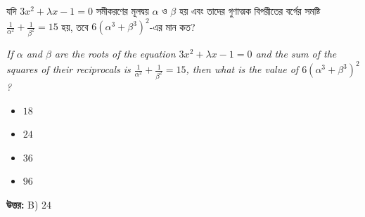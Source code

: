 \documentclass[12pt, a4paper]{article}
\begin{document}
\vspace{1.5em}

\begin{tcolorbox}[questionbox={প্রশ্ন (Question) 39}]
    \noindent
    যদি $3x^2 + \lambda x - 1 = 0$ সমীকরণের মূলদ্বয় $\alpha$ ও $\beta$ হয় এবং তাদের গুণাত্মক বিপরীতের বর্গের সমষ্টি $\frac{1}{\alpha^2} + \frac{1}{\beta^2} = 15$ হয়, তবে $6(\alpha^3 + \beta^3)^2$-এর মান কত?
    
    \vspace{0.8em}
    \begin{english}
    \noindent\textit{\color{darkgray}
    If $\alpha$ and $\beta$ are the roots of the equation $3x^2 + \lambda x - 1 = 0$ and the sum of the squares of their reciprocals is $\frac{1}{\alpha^2} + \frac{1}{\beta^2} = 15$, then what is the value of $6(\alpha^3 + \beta^3)^2$?
    }
    \end{english}
\end{tcolorbox}

\begin{itemize}[label={}, leftmargin=1cm, itemsep=0.5em]
    \item[\textbf{A)}] $18$
    \item[\textbf{B)}] $24$
    \item[\textbf{C)}] $36$
    \item[\textbf{D)}] $96$
\end{itemize}

\vspace{0.5em}
\begin{tcolorbox}[answerbox]
    \textbf{\color{success} উত্তর:} B) $24$
\end{tcolorbox}
\vspace{1em}
\end{document}
